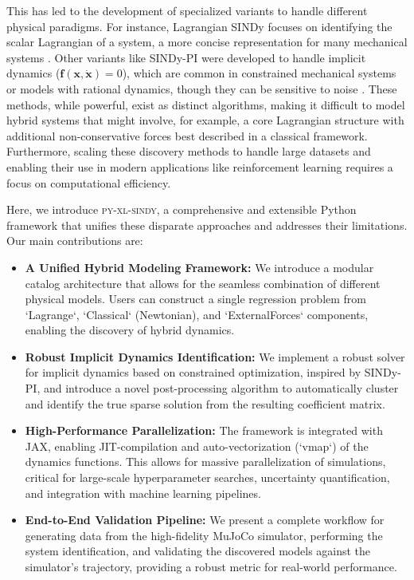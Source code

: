 \documentclass[12pt]{article}
\newcommand{\frameworkname}{\textsc{py-xl-sindy}}
\begin{document}
This has led to the development of specialized variants to handle different physical paradigms. For instance, Lagrangian SINDy focuses on identifying the scalar Lagrangian of a system, a more concise representation for many mechanical systems \cite{Chu2020_LagrangianSINDy, Purnomo2023_xLSINDy}. Other variants like SINDy-PI were developed to handle implicit dynamics ($\mathbf{f}(\mathbf{x}, \dot{\mathbf{x}}) = 0$), which are common in constrained mechanical systems or models with rational dynamics, though they can be sensitive to noise \cite{Kaheman2020_SINDyPI}. These methods, while powerful, exist as distinct algorithms, making it difficult to model hybrid systems that might involve, for example, a core Lagrangian structure with additional non-conservative forces best described in a classical framework. Furthermore, scaling these discovery methods to handle large datasets and enabling their use in modern applications like reinforcement learning requires a focus on computational efficiency.

Here, we introduce \frameworkname, a comprehensive and extensible Python framework that unifies these disparate approaches and addresses their limitations. Our main contributions are:
\begin{itemize}
    \item \textbf{A Unified Hybrid Modeling Framework:} We introduce a modular catalog architecture that allows for the seamless combination of different physical models. Users can construct a single regression problem from `Lagrange`, `Classical` (Newtonian), and `ExternalForces` components, enabling the discovery of hybrid dynamics.
    \item \textbf{Robust Implicit Dynamics Identification:} We implement a robust solver for implicit dynamics based on constrained optimization, inspired by SINDy-PI, and introduce a novel post-processing algorithm to automatically cluster and identify the true sparse solution from the resulting coefficient matrix.
    \item \textbf{High-Performance Parallelization:} The framework is integrated with JAX, enabling JIT-compilation and auto-vectorization (`vmap`) of the dynamics functions. This allows for massive parallelization of simulations, critical for large-scale hyperparameter searches, uncertainty quantification, and integration with machine learning pipelines.
    \item \textbf{End-to-End Validation Pipeline:} We present a complete workflow for generating data from the high-fidelity MuJoCo simulator, performing the system identification, and validating the discovered models against the simulator's trajectory, providing a robust metric for real-world performance.
\end{itemize}
\end{document}
